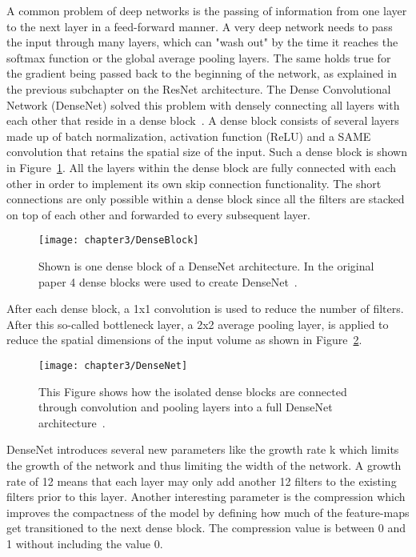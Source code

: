 A common problem of deep networks is the passing of information from one layer to the next layer in a feed-forward manner. A very deep network needs to pass the input through many layers, which can "wash out" by the time it reaches the softmax function or the global average pooling layers. The same holds true for the gradient being passed back to the beginning of the network, as explained in the previous subchapter on the ResNet architecture. The Dense Convolutional Network (DenseNet) solved this problem with densely connecting all layers with each other that reside in a dense block~\cite{huang2017densely}. A dense block
consists of several layers made up of batch normalization, activation function (ReLU) and a SAME convolution that retains the spatial size of the input. Such a dense block is shown in Figure~\ref{fig:DenseBlock}. All the layers within the dense block are fully connected with each other in order to implement its own skip connection functionality. The short connections are only possible within a dense block since all the filters are stacked on top of each other and forwarded to every subsequent layer.\\


\begin{figure}[!h]
  \centering
  \caption{Shown is one dense block of a DenseNet architecture. In the original paper 4 dense blocks were used to create DenseNet~\cite{huang2017densely}.}
  \texttt{[image: chapter3/DenseBlock]}
  \label{fig:DenseBlock}
\end{figure}


After each dense block, a 1x1 convolution is used to reduce the number of filters. After this so-called bottleneck layer, a 2x2 average pooling layer, is applied to reduce the spatial dimensions of the input volume as shown in Figure~\ref{fig:DenseNet}.\\


\begin{figure}[!h]
  \centering
  \caption{This Figure shows how the isolated dense blocks are connected through convolution and pooling layers into a full DenseNet architecture~\cite{huang2017densely}.}
  \texttt{[image: chapter3/DenseNet]}
  \label{fig:DenseNet}
\end{figure}


DenseNet introduces several new parameters like the growth rate k which limits the growth of the network and thus limiting the width of the network. A growth rate of 12 means that each layer may only add another 12 filters to the existing filters prior to this layer. Another interesting parameter is the compression which improves the compactness of the model by defining how much of the feature-maps get transitioned to the next dense block. The compression value is between 0 and 1 without including the value 0.\\

